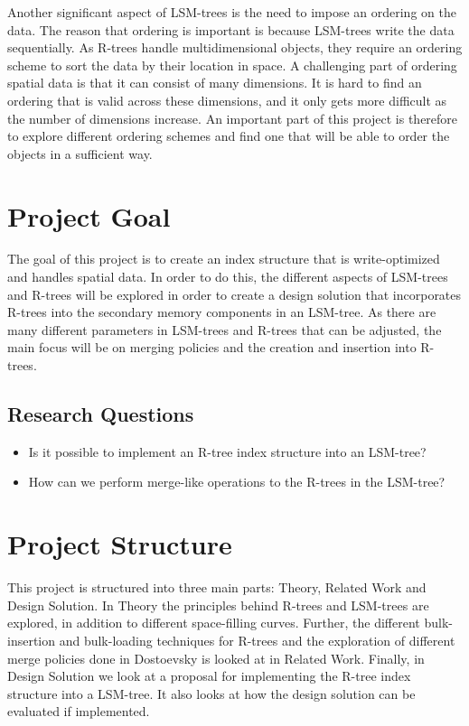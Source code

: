 \noindent
Another significant aspect of LSM-trees is the need to impose an ordering on the data. The reason that ordering is important is because LSM-trees write the data sequentially. As R-trees handle multidimensional objects, they require an ordering scheme to sort the data by their location in space. A challenging part of ordering spatial data is that it can consist of many dimensions. It is hard to find an ordering that is valid across these dimensions, and it only gets more difficult as the number of dimensions increase. An important part of this project is therefore to explore different ordering schemes and find one that will be able to order the objects in a sufficient way.

\section{Project Goal}
The goal of this project is to create an index structure that is write-optimized and handles spatial data. In order to do this, the different aspects of LSM-trees and R-trees will be explored in order to create a design solution that incorporates R-trees into the secondary memory components in an LSM-tree. As there are many different parameters in LSM-trees and R-trees that can be adjusted, the main focus will be on merging policies and the creation and insertion into R-trees. 

\subsection{Research Questions}
\begin{itemize}
    \item Is it possible to implement an R-tree index structure into an LSM-tree?
    \item How can we perform merge-like operations to the R-trees in the LSM-tree?
\end{itemize}

\section{Project Structure}
This project is structured into three main parts: Theory, Related Work and Design Solution. In Theory the principles behind R-trees and LSM-trees are explored, in addition to different space-filling curves. Further, the different bulk-insertion and bulk-loading techniques for R-trees and the exploration of different merge policies done in Dostoevsky\cite{Dostoevsky} is looked at in Related Work. Finally, in Design Solution we look at a proposal for implementing the R-tree index structure into a LSM-tree. It also looks at how the design solution can be evaluated if implemented. 
